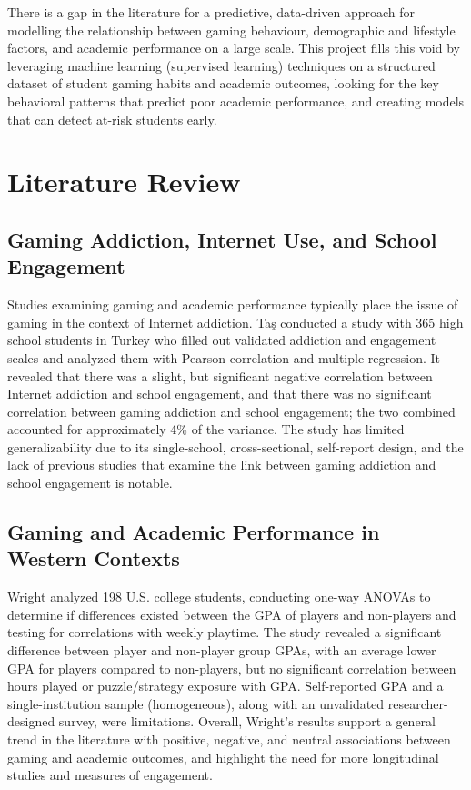 \documentclass[conference]{IEEEtran}
\begin{document}
There is a gap in the literature for a predictive, data-driven approach for modelling the relationship between gaming behaviour, demographic and lifestyle factors, and academic performance on a large scale. This project fills this void by leveraging machine learning (supervised learning) techniques on a structured dataset of student gaming habits and academic outcomes, looking for the key behavioral patterns that predict poor academic performance, and creating models that can detect at-risk students early.

\section{Literature Review}

\subsection{Gaming Addiction, Internet Use, and School Engagement}
Studies examining gaming and academic performance typically place the issue of gaming in the context of Internet addiction. Ta\c{s} \cite{tas2019} conducted a study with 365 high school students in Turkey who filled out validated addiction and engagement scales and analyzed them with Pearson correlation and multiple regression. It revealed that there was a slight, but significant negative correlation between Internet addiction and school engagement, and that there was no significant correlation between gaming addiction and school engagement; the two combined accounted for approximately 4\% of the variance. The study has limited generalizability due to its single-school, cross-sectional, self-report design, and the lack of previous studies that examine the link between gaming addiction and school engagement is notable.


\subsection{Gaming and Academic Performance in Western Contexts}
Wright \cite{wright2011} analyzed 198 U.S. college students, conducting one-way ANOVAs to determine if differences existed between the GPA of players and non-players and testing for correlations with weekly playtime. The study revealed a significant difference between player and non-player group GPAs, with an average lower GPA for players compared to non-players, but no significant correlation between hours played or puzzle/strategy exposure with GPA. Self-reported GPA and a single-institution sample (homogeneous), along with an unvalidated researcher-designed survey, were limitations. Overall, Wright's results support a general trend in the literature with positive, negative, and neutral associations between gaming and academic outcomes, and highlight the need for more longitudinal studies and measures of engagement.
\end{document}
